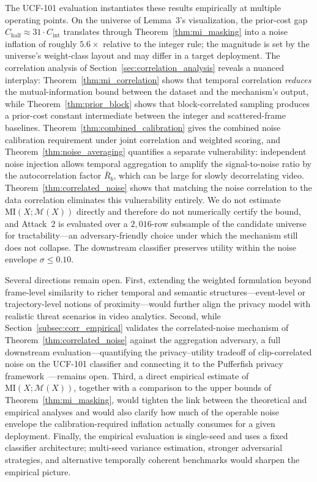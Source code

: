 \documentclass[letterpaper]{article} %
\newcommand{\MI}{\mathrm{MI}}
\begin{document}
The UCF-101 evaluation instantiates these results empirically at multiple operating points. On the universe of Lemma~3's visualization, the prior-cost gap $C_{\mathrm{half}} \approx 31 \cdot C_{\mathrm{int}}$ translates through Theorem~\ref{thm:mi_masking} into a noise inflation of roughly $5.6\times$ relative to the integer rule; the magnitude is set by the universe's weight-class layout and may differ in a target deployment. The correlation analysis of Section~\ref{sec:correlation_analysis} reveals a nuanced interplay: Theorem~\ref{thm:mi_correlation} shows that temporal correlation \emph{reduces} the mutual-information bound between the dataset and the mechanism's output, while Theorem~\ref{thm:prior_block} shows that block-correlated sampling produces a prior-cost constant intermediate between the integer and scattered-frame baselines.  Theorem~\ref{thm:combined_calibration} gives the combined noise calibration requirement under joint correlation and weighted scoring, and Theorem~\ref{thm:noise_averaging} quantifies a separate vulnerability: independent noise injection allows temporal aggregation to amplify the signal-to-noise ratio by the autocorrelation factor $\bar{R}_b$, which can be large for slowly decorrelating video.  Theorem~\ref{thm:correlated_noise} shows that matching the noise correlation to the data correlation eliminates this vulnerability entirely.  We do not estimate $\MI(X; \mathcal{M}(X))$ directly and therefore do not numerically certify the bound, and Attack~2 is evaluated over a $2{,}016$-row subsample of the candidate universe for tractability---an adversary-friendly choice under which the mechanism still does not collapse. The downstream classifier preserves utility within the noise envelope $\sigma \le 0.10$.

Several directions remain open. First, extending the weighted formulation beyond frame-level similarity to richer temporal and semantic structures---event-level or trajectory-level notions of proximity---would further align the privacy model with realistic threat scenarios in video analytics. Second, while Section~\ref{subsec:corr_empirical} validates the correlated-noise mechanism of Theorem~\ref{thm:correlated_noise} against the aggregation adversary, a full downstream evaluation---quantifying the privacy--utility tradeoff of clip-correlated noise on the UCF-101 classifier and connecting it to the Pufferfish privacy framework~\cite{kifer2014pufferfish,song2017pufferfish}---remains open. Third, a direct empirical estimate of $\MI(X; \mathcal{M}(X))$, together with a comparison to the upper bounds of Theorem~\ref{thm:mi_masking}, would tighten the link between the theoretical and empirical analyses and would also clarify how much of the operable noise envelope the calibration-required inflation actually consumes for a given deployment. Finally, the empirical evaluation is single-seed and uses a fixed classifier architecture; multi-seed variance estimation, stronger adversarial strategies, and alternative temporally coherent benchmarks would sharpen the empirical picture.
\end{document}
